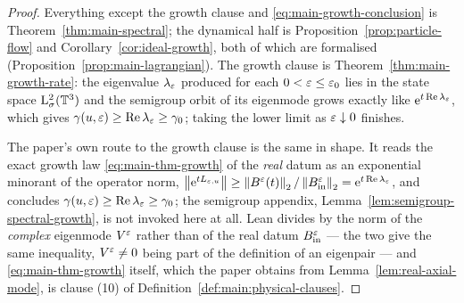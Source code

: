 \begin{proof}
  \leanok
  Everything except the growth clause and \eqref{eq:main-growth-conclusion} is
  Theorem~\ref{thm:main-spectral}; the dynamical half is
  Proposition~\ref{prop:particle-flow} and Corollary~\ref{cor:ideal-growth}, both of which
  are formalised (Proposition~\ref{prop:main-lagrangian}).  The growth clause is
  Theorem~\ref{thm:main-growth-rate}: the eigenvalue $\lambda_\varepsilon$ produced
  for each $0<\varepsilon\leq\varepsilon_0$ lies in the state space $\mathrm{L}^2_\sigma(\mathbb{T}^3)$ and
  the semigroup orbit of its eigenmode grows exactly like
  $\mathrm{e}^{t\operatorname{Re}\lambda_\varepsilon}$, which gives
  $\gamma(u,\varepsilon)\geq\operatorname{Re}\lambda_\varepsilon\geq\gamma_0$; taking the lower limit as
  $\varepsilon\downarrow0$ finishes.

  The paper's own route to the growth clause is the same in shape.  It reads the
  exact growth law \eqref{eq:main-thm-growth} of the \emph{real} datum as an exponential
  minorant of the operator norm,
  $\left\|\mathrm{e}^{tL_{\varepsilon,u}}\right\|\geq\left\|B^\varepsilon(t)\right\|_2/\left\|B_{\rm in}^\varepsilon\right\|_2
  =\mathrm{e}^{t\operatorname{Re}\lambda_\varepsilon}$, and concludes
  $\gamma(u,\varepsilon)\geq\operatorname{Re}\lambda_\varepsilon\geq\gamma_0$; the semigroup appendix,
  Lemma~\ref{lem:semigroup-spectral-growth}, is not invoked here at all.  Lean divides by the
  norm of the \emph{complex} eigenmode $V^\varepsilon$ rather than of the real datum
  $B_{\rm in}^\varepsilon$ --- the two give the same inequality, $V^\varepsilon\neq0$ being part of the
  definition of an eigenpair --- and \eqref{eq:main-thm-growth} itself, which the paper
  obtains from Lemma~\ref{lem:real-axial-mode}, is clause (10) of
  Definition~\ref{def:main:physical-clauses}.
\end{proof}


